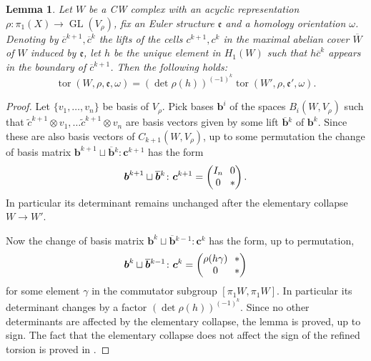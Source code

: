 \documentclass[10pt]{amsart}
\theoremstyle{plain}
\newtheorem{lem}[thm]{Lemma}
\theoremstyle{definition}
\theoremstyle{remark}
\DeclareMathOperator{\GL}{GL}
\numberwithin{equation}{section}
\DeclareMathOperator{\tor}{tor}
\begin{document}
\begin{lem}
\label{lem:torcollapse}
Let $W$ be a CW complex with an acyclic representation $\rho\colon \pi_1(X) \to \GL(V_\rho)$, fix an Euler structure $\mathfrak e$ and a homology orientation $\omega$. Denoting by $\overline c^{k+1}, \overline c^k$ the lifts of the cells $c^{k+1}, c^k$ in the maximal abelian cover $\overline W$ of $W$ induced by $\mathfrak e$, let $h$ be the unique element in $H_1(W)$ such that $h \overline c^k$ appears in the boundary of $\overline c^{k+1}$. Then the following holds:
\[
\tor(W, \rho, \mathfrak e, \omega) = (\det \rho(h))^{(-1)^k} \tor(W', \rho, \mathfrak e', \omega).
\]
\end{lem}
\begin{proof}
Let $\{v_1, \ldots, v_n\}$ be basis of $V_\rho$.
Pick bases $\boldsymbol{b}^i$ of the spaces $B_i(W,V_\rho)$ such that $\widetilde c^{k+1} \otimes v_1, \ldots \widetilde c^{k+1} \otimes v_n$ are basis vectors given by some lift $\boldsymbol{\overline b}{}^{k}$ of $\boldsymbol{b}^k$. Since these are also basis vectors of $C_{k+1}(W, V_\rho)$, up to some permutation the change of basis matrix $\boldsymbol{b}^{k+1} \sqcup \boldsymbol{\overline b}{}^{k} \colon \boldsymbol{c}^{k+1}$ has the form
\[\arraycolsep3.5pt
\boldsymbol{b}^{k+1} \sqcup \boldsymbol{\overline b}{}^{k} \colon \boldsymbol{c}^{k+1} = \begin{pmatrix} I_n & 0 \\ 0 & \ast \end{pmatrix}.
\]
In particular its determinant remains unchanged after the elementary collapse~\hbox{$W \!\!\to\! W'\!$}.

Now the change of basis matrix $\boldsymbol{b}^{k} \sqcup \boldsymbol{\overline b}{}^{k-1} \colon \boldsymbol{c}^{k}$ has the form, up to permutation,
\[\arraycolsep3.5pt
\boldsymbol{b}^{k} \sqcup \boldsymbol{\overline b}{}^{k-1} \colon \boldsymbol{c}^{k} = \begin{pmatrix} \rho(h \gamma) & \ast \\ 0 & \ast \end{pmatrix}
\]
for some element $\gamma$ in the commutator subgroup $[\pi_1 W, \pi_1 W]$. In particular its determinant changes by a factor $(\det \rho(h))^{(-1)^k}$. Since no other determinants are affected by the elementary collapse, the lemma is proved, up to sign.
The fact that the elementary collapse does not affect the sign of the refined torsion is proved in \cite[Lem.\,18.4]{Turaev_book}.
\end{proof}
\end{document}
